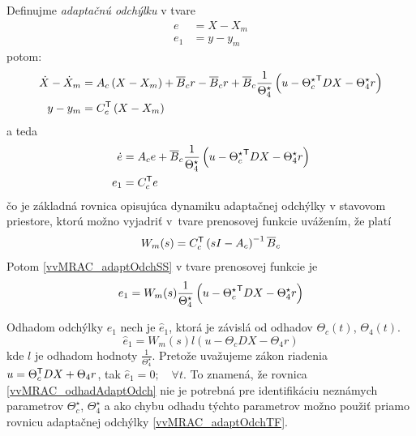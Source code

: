 ﻿\documentclass[a4paper, 10pt, ]{article}
\begin{document}
Definujme \emph{adaptačnú odchýlku} v tvare
\begin{align}
	e &=  X -  X_m \\
	e_1 & = y - y_m
\end{align}
potom:
\begin{subequations} \label{vvMRAC_adaptOdchmedzi}
	\begin{align}
		\dot X - \dot X_m &= A_c \left( X -  X_m \right) + \overline{B}_c r - \overline{B}_c r + \overline{B}_c \frac{1}{\Theta_4^\star} \left( u - {\Theta_c^\star}^{\mathsf{T}} D   X - \Theta_4^\star  r \right) \\
		y - y_m &= C_c^{\mathsf{T}} \left(  X - X_m \right)
	\end{align}
\end{subequations}
a teda
\begin{subequations}
\label{vvMRAC_adaptOdchSS}
	\begin{align}
		\dot{e} &= A_c e + \overline{B}_c \frac{1}{\Theta_4^\star} \left( u - {\Theta_c^\star}^{\mathsf{T}} D   X - \Theta_4^\star r \right) \\
		e_1  &= C_c^{\mathsf{T}} e
	\end{align}
\end{subequations}
čo je základná rovnica opisujúca dynamiku adaptačnej odchýlky v stavovom priestore, ktorú možno vyjadriť v~tvare prenosovej funkcie uvážením, že platí
\begin{equation}
	W_m(s) = C_c^{\mathsf{T}} \left( s I - A_c \right)^{-1} \overline{B}_c
\end{equation}
Potom \eqref{vvMRAC_adaptOdchSS} v tvare prenosovej funkcie je
\begin{equation} \label{vvMRAC_adaptOdchTF}
	e_1 = W_m(s)  \frac{1}{\Theta_4^\star} \left( u - {\Theta_c^\star}^{\mathsf{T}} D  X - \Theta_4^\star r \right)
\end{equation}

Odhadom odchýlky $e_1$ nech je $\hat{e}_1$, ktorá je závislá od odhadov $\Theta_c(t)$, $\Theta_4(t)$.
\begin{equation} \label{vvMRAC_odhadAdaptOdch}
	\hat{e}_1 = W_m(s)  l \left( u - \Theta_c D  X - \Theta_4 r \right)
\end{equation}
kde $l$ je odhadom hodnoty $\frac{1}{\Theta_4^\star}$. Pretože uvažujeme zákon riadenia $ u = \Theta_c^{\mathsf{T}} D
 X + \Theta_4 r $, tak $\hat{e}_1 = 0; \quad \forall t$. To znamená, že rovnica \eqref{vvMRAC_odhadAdaptOdch} nie je potrebná pre identifikáciu neznámych parametrov $\Theta_c^\star$, $\Theta_4^\star$ a ako chybu odhadu týchto parametrov možno použiť priamo rovnicu adaptačnej odchýlky \eqref{vvMRAC_adaptOdchTF}.
\end{document}
